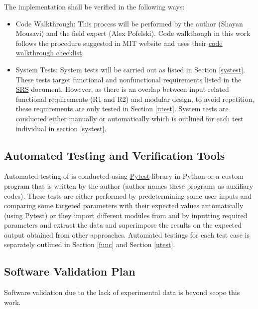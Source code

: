 \documentclass[12pt, titlepage]{article}
\begin{document}
The implementation shall be verified in the following ways:
\begin{itemize}
	\item Code Walkthrough: This process will be performed by the author (Shayan Mousavi) and the field expert (Alex Pofelski). Code walkthough in this work follows the procedure suggested in MIT website \citep{Checklis7:online} and uses their \href{http://www.mit.edu/~mbarker/ideas/review.txt}{code walkthrough checklist}.
	
	\item System Tests:  System tests will be carried out as listed in Section \ref{systest}. These tests target functional and nonfunctional requirements listed in the \href{https://github.com/shmouses/SPDFM/tree/master/docs/SRS}{SRS} document. However, as there is an overlap between input related functional requirements (R1 and R2) and \progname{} modular design, to avoid repetition, these requirements are only tested in Section \ref{utest}. System tests are conducted either manually or automatically which is outlined for each test individual in section \ref{systest}. 
\end{itemize}



\subsection{Automated Testing and Verification Tools}

Automated testing of \progname{} is conducted using \href{pytest.org}{Pytest} library in Python or a custom program that is written by the author (author names these programs as auxiliary codes).
These tests are either performed by predetermining some user inputs and comparing some targeted  parameters with their expected values automatically (using Pytest) or they import different modules from \progname{} and by inputting required parameters and extract the data and superimpose the results on the expected output obtained from other approaches. Automated testings for each test case is separately outlined in Section \ref{func} and Section \ref{utest}.

\subsection{Software Validation Plan}
 
Software validation due to the lack of experimental data is beyond scope this work.
 
\end{document}
